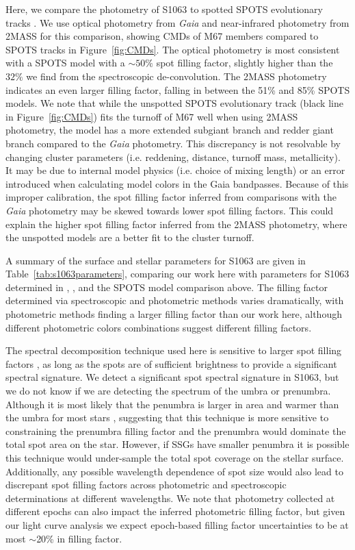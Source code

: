 \documentclass[modern,trackchanges]{aastex631}
\begin{document}
Here, we compare the photometry of S1063 to spotted SPOTS evolutionary tracks \citep{somers20}.  We use optical photometry from \textit{Gaia} and near-infrared photometry from 2MASS for this comparison, showing CMDs of M67 members compared to SPOTS tracks in Figure~\ref{fig:CMDs}. The optical photometry is most consistent with a SPOTS model with a $\sim50\%$ spot filling factor, slightly higher than the $32\%$ we find from the spectroscopic de-convolution. The 2MASS photometry indicates an even larger filling factor, falling in between the 51\% and 85\% SPOTS models. We note that while the unspotted SPOTS evolutionary track (black line in Figure~\ref{fig:CMDs}) fits the turnoff of M67 well when using 2MASS photometry, the model has a more extended subgiant branch and redder giant branch compared to the \textit{Gaia} photometry. This discrepancy is not resolvable by changing cluster parameters (i.e. reddening, distance, turnoff mass, metallicity). It may be due to internal model physics (i.e. choice of mixing length) or an error introduced when calculating model colors in the Gaia bandpasses. Because of this improper calibration, the spot filling factor inferred from comparisons with the \textit{Gaia} photometry may be skewed towards lower spot filling factors. This could explain the higher spot filling factor inferred from the 2MASS photometry, where the unspotted models are a better fit to the cluster turnoff. 

A summary of the surface and stellar parameters for S1063 are given in Table~\ref{tab:s1063parameters}, comparing our work here with parameters for S1063 determined in \citet{mathieu03}, \citet{leiner17}, and the SPOTS model comparison above. The filling factor determined via spectroscopic and photometric methods varies dramatically, with photometric methods finding a larger filling factor than our work here, although different photometric colors combinations suggest different filling factors. 

The spectral decomposition technique used here is sensitive to larger spot filling factors \citep{gullysantiago17}, as long as the spots are of sufficient brightness to provide a significant spectral signature. We detect a significant spot spectral signature in S1063, but we do not know if we are detecting the spectrum of the umbra or prenumbra. Although it is most likely that the penumbra is larger in area and warmer than the umbra for most stars \citep{1981ApJ...250..327V}, suggesting that this technique is more sensitive to constraining the prenumbra filling factor and the prenumbra would dominate the total spot area on the star. However, if SSGs have smaller penumbra it is possible this technique would under-sample the total spot coverage on the stellar surface. Additionally, any possible wavelength dependence of spot size would also lead to discrepant spot filling factors across photometric and spectroscopic determinations at different wavelengths. We note that photometry collected at different epochs can also impact the inferred photometric filling factor, but given our light curve analysis we expect epoch-based filling factor uncertainties to be at most $\sim$20\% in filling factor. 
\end{document}
